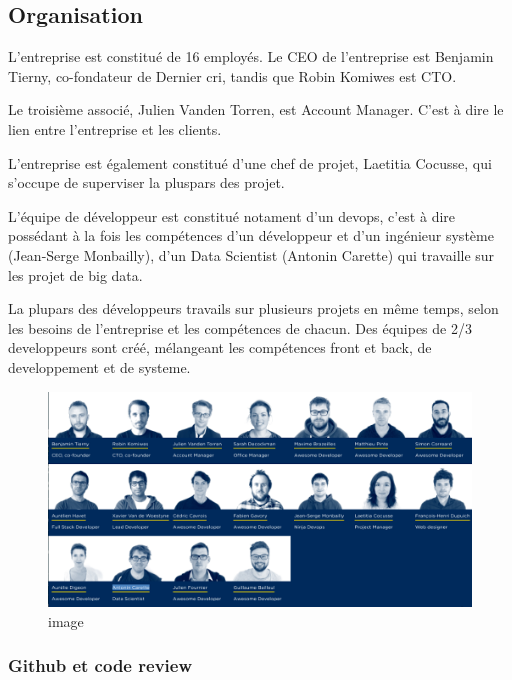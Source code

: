 \subsection{Organisation}\label{organisation}

\bigskip

L'entreprise est constitué de 16 employés. Le CEO de l'entreprise est
Benjamin Tierny, co-fondateur de Dernier cri, tandis que Robin Komiwes
est CTO.

\bigskip

Le troisième associé, Julien Vanden Torren, est Account Manager. C'est à
dire le lien entre l'entreprise et les clients.

\bigskip

L'entreprise est également constitué d'une chef de projet, Laetitia
Cocusse, qui s'occupe de superviser la pluspars des projet.

\bigskip

L'équipe de développeur est constitué notament d'un devops, c'est à dire
possédant à la fois les compétences d'un développeur et d'un ingénieur
système (Jean-Serge Monbailly), d'un Data Scientist (Antonin Carette)
qui travaille sur les projet de big data.

\bigskip

La plupars des développeurs travails sur plusieurs projets en même
temps, selon les besoins de l'entreprise et les compétences de chacun.
Des équipes de 2/3 developpeurs sont créé, mélangeant les compétences
front et back, de developpement et de systeme.

\bigskip

\begin{figure}
\centering
\includegraphics{team.png}
\caption{image}
\end{figure}

\subsubsection{Github et code review}\label{github-et-code-review}

